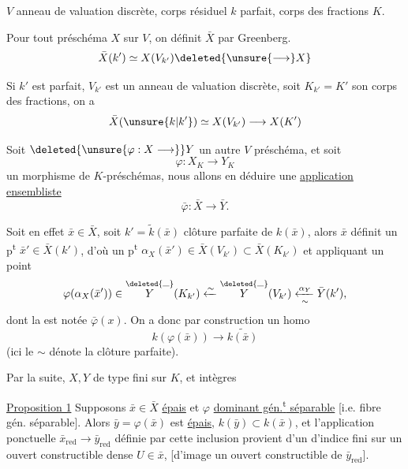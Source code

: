 $V$ anneau de valuation discrète, corps résiduel $k$ parfait, corps des fractions $K$.

Pour tout préschéma $X$ sur $V$, on définit $\bar X$ par Greenberg.
\[
\bar X(k')\simeq X(V_{k'})\deleted{\unsure{\longrightarrow}X}
\]

Si $k'$ est parfait, $V_{k'}$ est un anneau de valuation discrète, soit $K_{k'}=K'$ son corps des fractions, on a
\[
\bar X(\unsure{k|k'})\simeq X(V_{k'})\longrightarrow X(K')
\]

Soit $\deleted{\unsure{\varphi:X\longrightarrow}}Y$ un autre $V$ préschéma,  et soit
\[
\varphi:X_K\longrightarrow Y_K
\]
un morphisme de $K$-préschémas, nous allons en déduire une \uline{application ensembliste}
\[
\bar\varphi:\bar X\longrightarrow\bar Y.
\]

Soit en effet $\bar x\in\bar X$, soit $k'=\widetilde{k}(\bar x)$   clôture parfaite de $k(\bar x)$, alors $\bar x$ définit un p\textsuperscript{t} $\bar x'\in\bar X(k')$, d'où un p\textsuperscript{t}  $\alpha_X(\bar x')\in\bar X(V_{k'})\subset\bar X(K_{k'})$ et appliquant un point
\[
\varphi(\alpha_X(\bar x'))\in\overset{\deleted{\rule{.6em}{.3pt}}}{Y}(K_{k'})
\xleftarrow{\sim}\overset{\deleted{\rule{.6em}{.3pt}}}{Y}(V_{k'})
\xleftarrow[\sim]{\alpha_Y}\bar Y(k'),
\]
dont la  est notée $\bar\varphi(x)$. On a donc par construction un homo
\[
k(\varphi(\bar x))\longrightarrow\widetilde{k(\bar x)}
\]
(ici le $\sim$ dénote la clôture parfaite).


Par la suite, $X,Y$ de type fini sur $K$, et  intègres

\uline{Proposition 1} Supposons $\bar x\in\bar X$ \uline{épais} et $\varphi$ \uline{dominant gén.\textsuperscript{t} séparable} [i.e. fibre gén. séparable]. Alors  $\bar y=\varphi(\bar x)$  est \uline{épais}, $k(\bar y)\subset k(\bar x)$, et l'application ponctuelle $\bar x_{\mathrm{red}}\longrightarrow\bar y_{\mathrm{red}}$ définie par cette inclusion provient d'un  d'indice fini sur un ouvert constructible dense $U\in\bar x$, [d'image un ouvert constructible de $\bar y_{\mathrm{red}}$].
